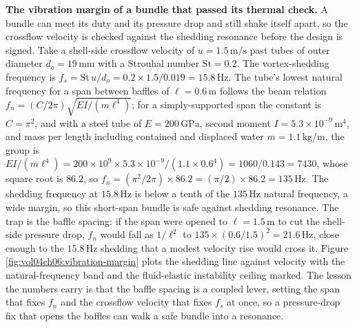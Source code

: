\textbf{The vibration margin of a bundle that passed its thermal check.} A bundle can
meet its duty and its pressure drop and still shake itself apart, so the crossflow
velocity is checked against the shedding resonance before the design is signed. Take a
shell-side crossflow velocity of $u = 1.5\,\text{m/s}$ past tubes of outer diameter
$d_o = 19\,\si{\milli\meter}$ with a Strouhal number $\mathrm{St} = 0.2$. The
vortex-shedding frequency is $f_s = \mathrm{St}\,u/d_o = 0.2\times 1.5/0.019 =
15.8\,\text{Hz}$. The tube's lowest natural frequency for a span between baffles of
$\ell = 0.6\,\text{m}$ follows the beam relation $f_n = (C/2\pi)\sqrt{EI/(m\ell^4)}$;
for a simply-supported span the constant is $C = \pi^2$, and with a steel tube of
$E = 200\,\text{GPa}$, second moment $I = 5.3\times 10^{-9}\,\text{m}^4$, and mass per
length including contained and displaced water $m = 1.1\,\text{kg/m}$, the group is
$EI/(m\ell^4) = 200\times 10^9\times 5.3\times 10^{-9}/(1.1\times 0.6^4) = 1060/0.143
= 7430$, whose square root is $86.2$, so $f_n = (\pi^2/2\pi)\times 86.2 =
(\pi/2)\times 86.2 = 135\,\text{Hz}$. The shedding frequency at $15.8\,\text{Hz}$ is
below a tenth of the $135\,\text{Hz}$ natural frequency, a wide margin, so this
short-span bundle is safe against shedding resonance. The trap is the baffle spacing:
if the span were opened to $\ell = 1.5\,\text{m}$ to cut the shell-side pressure drop,
$f_n$ would fall as $1/\ell^2$ to $135\times(0.6/1.5)^2 = 21.6\,\text{Hz}$, close
enough to the $15.8\,\text{Hz}$ shedding that a modest velocity rise would cross it.
Figure \ref{fig:vol04ch06:vibration-margin} plots the shedding line against velocity
with the natural-frequency band and the fluid-elastic instability ceiling marked. The
lesson the numbers carry is that the baffle spacing is a coupled lever, setting the
span that fixes $f_n$ and the crossflow velocity that fixes $f_s$ at once, so a
pressure-drop fix that opens the baffles can walk a safe bundle into a resonance.

